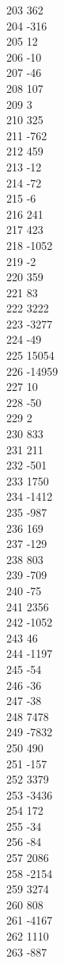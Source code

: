 { 203	362 \\
 204	-316 \\
 205	12 \\
 206	-10 \\
 207	-46 \\
 208	107 \\
 209	3 \\
 210	325 \\
 211	-762 \\
 212	459 \\
 213	-12 \\
 214	-72 \\
 215	-6 \\
 216	241 \\
 217	423 \\
 218	-1052 \\
 219	-2 \\
 220	359 \\
 221	83 \\
 222	3222 \\
 223	-3277 \\
 224	-49 \\
 225	15054 \\
 226	-14959 \\
 227	10 \\
 228	-50 \\
 229	2 \\
 230	833 \\
 231	211 \\
 232	-501 \\
 233	1750 \\
 234	-1412 \\
 235	-987 \\
 236	169 \\
 237	-129 \\
 238	803 \\
 239	-709 \\
 240	-75 \\
 241	2356 \\
 242	-1052 \\
 243	46 \\
 244	-1197 \\
 245	-54 \\
 246	-36 \\
 247	-38 \\
 248	7478 \\
 249	-7832 \\
 250	490 \\
 251	-157 \\
 252	3379 \\
 253	-3436 \\
 254	172 \\
 255	-34 \\
 256	-84 \\
 257	2086 \\
 258	-2154 \\
 259	3274 \\
 260	808 \\
 261	-4167 \\
 262	1110 \\
 263	-887 \\
}
